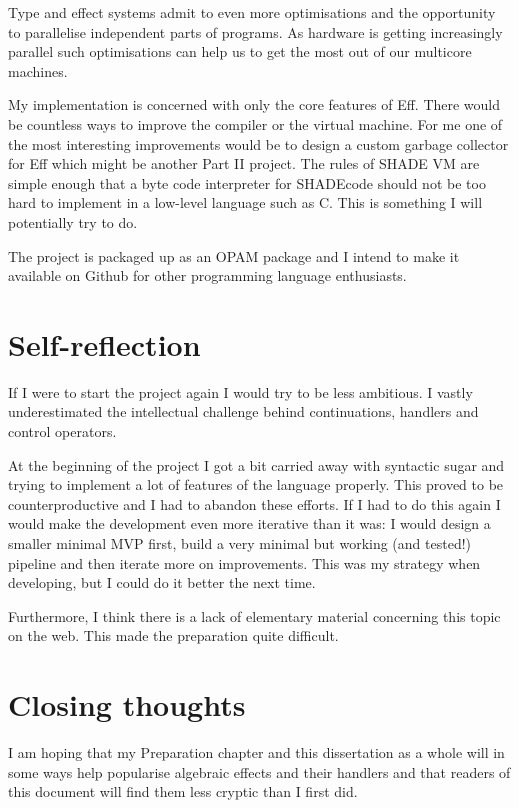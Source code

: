 \documentclass[class=article, crop=false]{standalone}
\begin{document}
Type and effect systems admit to even more optimisations and the opportunity to parallelise independent parts of programs.
As hardware is getting increasingly parallel such optimisations can help us to get the most out of our multicore machines.

My implementation is concerned with only the core features of Eff. There would be countless ways to improve the compiler
or the virtual machine. For me one of the most interesting improvements would be to design a custom garbage collector for Eff
which might be another Part II project. The rules of SHADE VM are simple enough that a byte code interpreter for SHADEcode
should not be too hard to implement in a low-level language such as C. This is something I will potentially try to do.

The project is packaged up as an OPAM package and I intend to make it available on Github for other programming
language enthusiasts.


\section{Self-reflection}

If I were to start the project again I would try to be less ambitious. I vastly underestimated the intellectual challenge
behind continuations, handlers and control operators.

At the beginning of the project I got a bit carried away with syntactic sugar and trying to implement a lot of features
of the language properly. This proved to be counterproductive and I had to abandon these efforts. If I had to do this
again I would make the development even more iterative than it was: I would design a smaller minimal MVP first, build
a very minimal but working (and tested!) pipeline and then iterate more on improvements. This was my strategy when developing,
but I could do it better the next time.

Furthermore, I think there is a lack of elementary material concerning this topic on the web. This made the preparation
quite difficult.

\section{Closing thoughts}

I am hoping that my Preparation chapter and this dissertation as a whole will in some ways help popularise algebraic effects
and their handlers and that readers of this document will find them less cryptic than I first did.
\end{document}
